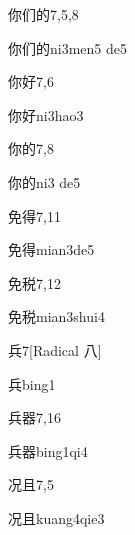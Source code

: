 \begin{entry}{你们的}{7,5,8}
  \begin{phonetics}{你们的}{ni3men5 de5}
  \end{phonetics}
\end{entry}

\begin{entry}{你好}{7,6}
  \begin{phonetics}{你好}{ni3hao3}
  \end{phonetics}
\end{entry}

\begin{entry}{你的}{7,8}
  \begin{phonetics}{你的}{ni3 de5}
  \end{phonetics}
\end{entry}

\begin{entry}{免得}{7,11}
  \begin{phonetics}{免得}{mian3de5}
  \end{phonetics}
\end{entry}

\begin{entry}{免税}{7,12}
  \begin{phonetics}{免税}{mian3shui4}
  \end{phonetics}
\end{entry}

\begin{entry}{兵}{7}[Radical 八]
  \begin{phonetics}{兵}{bing1}
  \end{phonetics}
\end{entry}

\begin{entry}{兵器}{7,16}
  \begin{phonetics}{兵器}{bing1qi4}
  \end{phonetics}
\end{entry}

\begin{entry}{况且}{7,5}
  \begin{phonetics}{况且}{kuang4qie3}
  \end{phonetics}
\end{entry}

